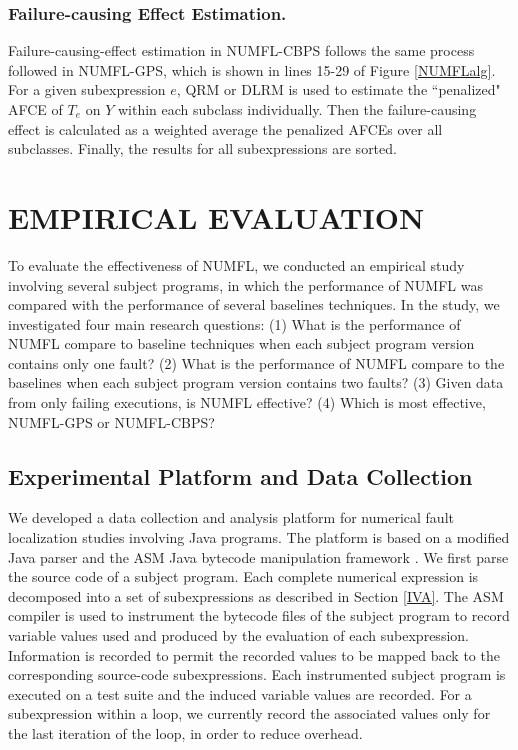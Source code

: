 \documentclass[times]{stvrauth}
\begin{document}
\subsubsection{Failure-causing Effect Estimation.}
Failure-causing-effect estimation in NUMFL-CBPS follows the same process followed in NUMFL-GPS, which is shown in lines 15-29 of Figure \ref{NUMFLalg}.  For a given subexpression $e$, QRM or DLRM is used to estimate the ``penalized" AFCE of $T_e$ on $Y$ within each subclass individually. Then the failure-causing effect is calculated as a weighted average the penalized AFCEs over all subclasses. Finally, the results for all subexpressions are sorted.

\section{EMPIRICAL EVALUATION}\label{evaluation}
To evaluate the effectiveness of NUMFL, we conducted an empirical study involving several subject programs, in which the performance of NUMFL was compared with the performance of several baselines techniques. In the study, we investigated four main research questions:  (1) What is the performance of NUMFL compare to baseline techniques when each subject program version contains only one fault?  (2) What is the performance of NUMFL compare to the baselines when each subject program version contains two faults?   (3) Given data from only failing executions, is NUMFL effective?  (4) Which is most effective, NUMFL-GPS or NUMFL-CBPS?

\subsection{Experimental Platform and Data Collection}
We developed a data collection and analysis platform for numerical fault localization studies involving Java programs.  The platform is based on a modified Java parser \cite{Java} and the ASM Java bytecode manipulation framework \cite{ASM}.  We first parse the source code of a subject program.  Each complete numerical expression is decomposed into a set of subexpressions as described in Section \ref{IVA}.  The ASM compiler is used to instrument the bytecode files of the subject program to record variable values used and produced by the evaluation of each subexpression.  Information is recorded to permit the recorded values to be mapped back to the corresponding source-code subexpressions.  Each instrumented subject program is executed on a test suite and the induced variable values are recorded.  For a subexpression within a loop, we currently record the associated values only for the last iteration of the loop, in order to reduce overhead.
\end{document}
